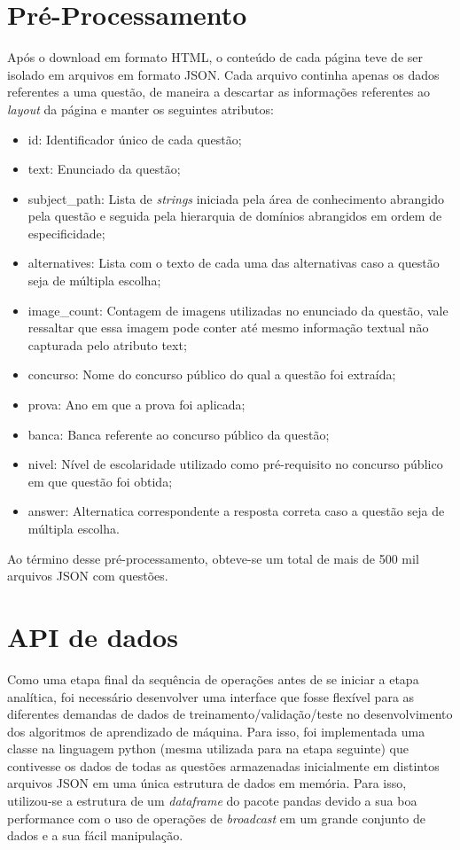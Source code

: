 \section{Pré-Processamento}

Após o download em formato HTML, o conteúdo de cada página teve de ser isolado em arquivos em formato JSON. Cada arquivo continha apenas os dados referentes a uma questão, de maneira a descartar as informações referentes ao \textit{layout} da página e manter os seguintes atributos:

\begin{itemize}
\item id: Identificador único de cada questão;
\item text: Enunciado da questão;
\item subject\_path: Lista de \textit{strings} iniciada pela área de conhecimento abrangido pela questão e seguida pela hierarquia de domínios abrangidos em ordem de especificidade;
\item alternatives: Lista com o texto de cada uma das alternativas caso a questão seja de múltipla escolha;
\item image\_count: Contagem de imagens utilizadas no enunciado da questão, vale ressaltar que essa imagem pode conter até mesmo informação textual não capturada pelo atributo text;
\item concurso: Nome do concurso público do qual a questão foi extraída;
\item prova: Ano em que a prova foi aplicada;
\item banca: Banca referente ao concurso público da questão;
\item nivel: Nível de escolaridade utilizado como pré-requisito no concurso público em que questão foi obtida;
\item answer: Alternatica correspondente a resposta correta caso a questão seja de múltipla escolha.
\end{itemize}

Ao término desse pré-processamento, obteve-se um total de mais de 500 mil arquivos JSON com questões.

\section{API de dados}
\label{dataset_api}

Como uma etapa final da sequência de operações antes de se iniciar a etapa analítica, foi necessário desenvolver uma interface que fosse flexível para as diferentes demandas de dados de treinamento/validação/teste no desenvolvimento dos algoritmos de aprendizado de máquina. Para isso, foi implementada uma classe na linguagem python (mesma utilizada para na etapa seguinte) que contivesse os dados de todas as questões armazenadas inicialmente em distintos arquivos JSON em uma única estrutura de dados em memória. Para isso, utilizou-se a estrutura de um \textit{dataframe} do pacote pandas devido a sua boa performance com o uso de operações de \textit{broadcast} em um grande conjunto de dados e a sua fácil manipulação.

